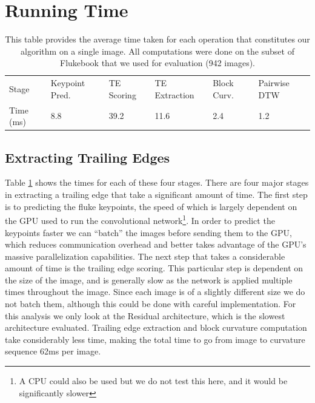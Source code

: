\section{Running Time}


\begin{table}[t]%
	\centering
	\resizebox{\linewidth}{!}
	{
		\begin{tabular} {| l || l | l | l | l || l |}
		\hline
		Stage & Keypoint Pred. & TE Scoring & TE Extraction & Block Curv. & Pairwise DTW \\
		\hhline{|=#===#==|}
		Time (ms) & 8.8 & 39.2 & 11.6 & 2.4 & 1.2 \\
		\hline
		\end{tabular}
	}
	\caption{This table provides the average time taken for each operation that constitutes our algorithm on a single image. All computations were done on the subset of Flukebook that we used for evaluation (942 images).}
	\label{tab:extract_te_times}
\end{table}




\subsection{Extracting Trailing Edges}

Table \ref{tab:extract_te_times} shows the times for each of these four stages.
There are four major stages in extracting a trailing edge that take a significant amount of time.
The first step is to predicting the fluke keypoints, the speed of which is largely dependent on the GPU used to run the convolutional network\footnote{A CPU could also be used but we do not test this here, and it would be significantly slower}.
In order to predict the keypoints faster we can ``batch'' the images before sending them to the GPU, which reduces communication overhead and better takes advantage of the GPU's massive parallelization capabilities.
The next step that takes a considerable amount of time is the trailing edge scoring.
This particular step is dependent on the size of the image, and is generally slow as the network is applied multiple times throughout the image.
Since each image is of a slightly different size we do not batch them, although this could be done with careful implementation.
For this analysis we only look at the Residual architecture, which is the slowest architecture evaluated.
Trailing edge extraction and block curvature computation take considerably less time, making the total time to go from image to curvature sequence 62ms per image.

